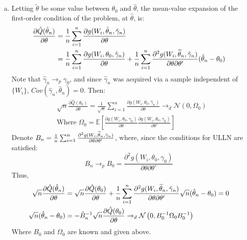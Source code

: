 \documentclass{article}
\newcommand{\N}{\mathcal{N}}
\newcommand{\est}[1]{\frac{1}{\lowercase{#1}}\sum_{i=1}^{\lowercase{#1}}}
\newcommand{\sumn}{\sum_{i=1}^{n}}
\renewcommand{\tilde}[1]{\widetilde{#1}}
\newcommand{\that}{\hat{\theta}_n}
\newcommand{\ttilde}{\tilde{\theta}_n}
\newcommand{\ghat}{\hat{\gamma}_n}
\newcommand{\E}[1]{\mathbb{E}\left[#1\right]}%
\begin{document}
\begin{enumerate}[(a)]
    \item Letting $\tilde{\theta}$ be some value between $\theta_0$ and $\hat{\theta}$, the mean-value expansion of the first-order condition of the problem, at $\hat{\theta}$, is:\begin{align*}
        \frac{\partial\hat{Q}(\that)}{\partial\theta} &= \est{n}\frac{\partial g(W_i, \that, \ghat)}{\partial\theta}    \\
        &= \est{n}\frac{\partial g(W_i, \theta_0, \ghat)}{\partial\theta} + \est{n}\frac{\partial^2g(W_i,\ttilde,\ghat)}{\partial\theta\partial\theta'}(\that - \theta_0)
    \end{align*}
    Note that ${\ghat\rightarrow_p\gamma_0}$, and since $\ghat$ was acquired via a sample independent of $\{W_i\}$, ${Cov(\ghat,\that)=0}$. Then: \begin{align*}
        &\sqrt{n}\frac{\partial \hat{Q}(\theta_0)}{\partial\theta}  = \frac{1}{\sqrt{n}}\sumn\frac{\partial g(W_i, \theta_0, \ghat)}{\partial\theta}\rightarrow_d \N\left(0, \Omega_0\right) \\ &\text{Where }\Omega_0 = \E{\frac{\partial g(W_i,\theta_0,\gamma_0)}{\partial\theta}\frac{\partial g(W_i,\theta_0,\gamma_0)}{\partial\theta'}}
    \end{align*}
    Denote ${B_n = \est{n}\frac{\partial^2g(W_i,\ttilde,\ghat)}{\partial\theta\partial\theta'}}$, where, since the conditions for ULLN are satisfied: \[
        B_n\rightarrow_p B_0 = \frac{\partial^2g(W_i,\theta_0,\gamma_0)}{\partial\theta\partial\theta'}
    \]
    Thus, \begin{align*}
        \sqrt{n}\frac{\partial\hat{Q}(\that)}{\partial\theta} &= \sqrt{n}\frac{\partial \hat{Q}(\theta_0)}{\partial\theta} + \est{n}\frac{\partial^2g(W_i,\ttilde,\ghat)}{\partial\theta\partial\theta'}\sqrt{n}(\that - \theta_0) = 0  \\
        \sqrt{n}(\that - \theta_0) &= -\hat{B}_n^{-1}\sqrt{n}\frac{\partial \hat{Q}(\theta_0)}{\partial\theta} \rightarrow_d \N\left(0,B_0^{-1}\Omega_0B_0^{-1}\right)
    \end{align*}
    Where $B_0$ and $\Omega_0$ are known and given above.


\end{enumerate}
\end{document}
